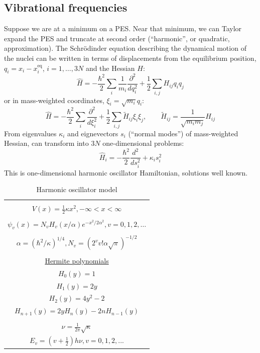 \documentclass[11pt]{article}
\begin{document}
\subsection{Vibrational frequencies}
\label{sec:org45f0c24}
Suppose we are at a minimum on a PES.  Near that minimum, we can Taylor expand the PES and truncate at second order (``harmonic'', or quadratic, approximation).  The Schr\"{o}dinder equation describing the dynamical motion of the nuclei can be written in terms of displacements from the equilibrium position, \(q_i = x_i - x^\text{eq}_i\), \(i =1, \ldots, 3N\) and the Hessian \(H\):
\[\hat{H} = -\frac{\hbar^2}{2}\sum_i \frac{1}{m_i}\frac{\partial^2}{dq_i^2}+\frac{1}{2}\sum_{i,j} H_{ij} q_i q_j\]
or in mass-weighted coordinates, \(\xi_i=\sqrt{m_i}q_i\):
\[ \hat{H} = -\frac{\hbar^2}{2}\sum_i \frac{\partial^2}{d\xi_i^2}+\frac{1}{2}\sum_{i,j} \tilde{H}_{ij} \xi_i \xi_j,\qquad \tilde{H}_{ij}=\frac{1}{\sqrt{m_i m_j}}H_{ij} \]
From eigenvalues \(\kappa_i\) and eignevectors \(s_i\) (``normal modes'') of mass-weighted Hessian, can transform into \(3N\) one-dimensional problems:
\[\hat{H}_i=-\frac{\hbar^2}{2}\frac{d^2}{ds_i^2}+\kappa_is_i^2\]
This is one-dimensional harmonic oscillator Hamiltonian, solutions well known.
\begin{table}[]
   \begin{center}
   \caption{Harmonic oscillator model}
    \label{Harmonic-oscillator}
\begin{tabular}[h]{|c|}
\hline
 \\
$\displaystyle       V(x) = \frac{1}{2} \kappa x^2, -\infty < x < \infty $ \\
 \\
$\displaystyle     \psi_v(x) = N_v H_v(x/\alpha)e^{-x^2/2\alpha^2}, v = 0, 1, 2, \ldots $ \\
\\
$\displaystyle \alpha=(\hbar^2/\kappa)^{1/4}, N_v=(2^vv!\alpha\sqrt{\pi})^{-1/2} $ \\
 \\
\underline{Hermite polynomials} \\
$\displaystyle H_0(y) =1$\\
$\displaystyle H_1(y) = 2y$\\
$\displaystyle H_2(y) = 4y^2-2$\\
$\displaystyle H_{n+1}(y) = 2 y H_n(y) -2 n H_{n-1}(y)$\\
 \\
$\displaystyle     \nu =\frac{1}{2\pi}\sqrt{\kappa}$ \\
$\displaystyle     E_v=\left (v+\frac{1}{2}\right )h \nu, v=0, 1, 2, ...$ \\
\hline
\end{tabular}
 \end{center}
\end{table}
\end{document}
